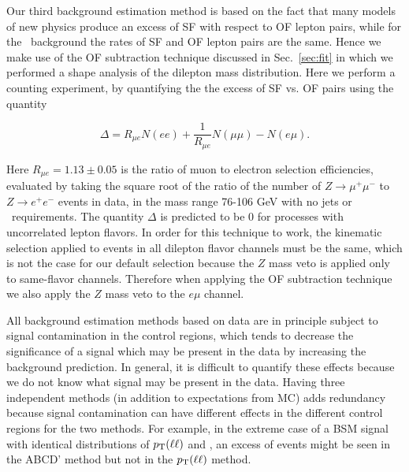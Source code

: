Our third background estimation method is based on the fact that many models of new physics
produce an excess of SF with respect to OF lepton pairs, while for the \ttbar\ background the
rates of SF and OF lepton pairs are the same. Hence we make use of the OF subtraction technique
discussed in Sec.~\ref{sec:fit} in which we performed a shape analysis of the dilepton mass distribution.
Here we perform a counting experiment, by quantifying the  the excess of SF vs. OF pairs using the
quantity

\begin{equation}
\label{eq:ofhighpt}
\Delta = R_{\mu e}N(ee) + \frac{1}{R_{\mu e}}N(\mu\mu) - N(e\mu).
\end{equation}

Here $R_{\mu e} = 1.13 \pm 0.05$ is the ratio of muon to electron selection efficiencies,
evaluated by taking the square root of the ratio of the number of 
$Z \to \mu^+\mu^-$ to $Z \to e^+e^-$ events in data, in the mass range 76-106 GeV with no jets or 
\met\ requirements. The quantity $\Delta$ is predicted to be 0 for processes with 
uncorrelated lepton flavors. In order for this technique to work, the kinematic selection 
applied to events in all dilepton flavor channels must be the same, which is not the case 
for our default selection because the $Z$ mass veto is applied only to same-flavor channels.
Therefore when applying the OF subtraction technique we also apply the $Z$ mass veto
to the $e\mu$ channel. 

All background estimation methods based on data are in principle subject to signal contamination
in the control regions, which tends to decrease the significance of a signal
which may be present in the data by increasing the background prediction.
In general, it is difficult to quantify these effects because we 
do not know what signal may be present in the data.  Having three
independent methods (in addition to expectations from MC)
adds redundancy because signal contamination can have different effects
in the different control regions for the two methods.
For example, in the extreme case of a
BSM signal with identical distributions of $p_{\mathrm{T}}(\ell \ell)$ and \MET, an excess of events might be seen 
in the ABCD' method but not in the $p_{\mathrm{T}}(\ell \ell)$ method.

